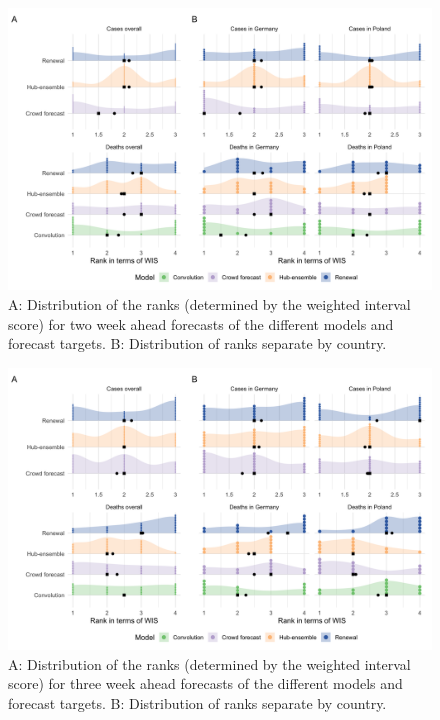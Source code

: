 \documentclass[10pt,letterpaper]{article} %
\begin{document}
\begin{figure}[H]
\includegraphics[width=1\linewidth,]{../analysis/plots/distribution_scores_wis-2-ranks} \caption{A: Distribution of the ranks (determined by the weighted interval score) for two week ahead forecasts of the different models and forecast targets. B: Distribution of ranks separate by country.}\label{fig:distribution-scores-ranks-2}
\end{figure}

\begin{figure}[H]
\includegraphics[width=1\linewidth,]{../analysis/plots/distribution_scores_wis-3-ranks} \caption{A: Distribution of the ranks (determined by the weighted interval score) for three week ahead forecasts of the different models and forecast targets. B: Distribution of ranks separate by country.}\label{fig:distribution-scores-ranks-3}
\end{figure}
\end{document}
